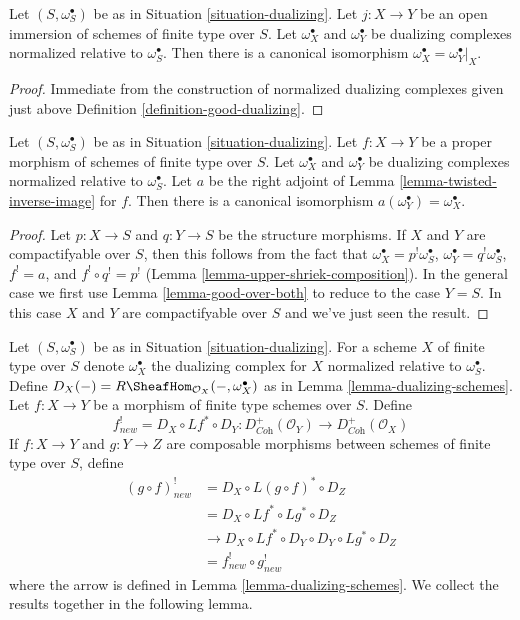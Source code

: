 \begin{lemma}
\label{lemma-open-immersion-good-dualizing-complex}
Let $(S, \omega_S^\bullet)$ be as in Situation \ref{situation-dualizing}.
Let $j : X \to Y$ be an open immersion of schemes of finite type over $S$.
Let $\omega_X^\bullet$ and $\omega_Y^\bullet$ be dualizing complexes
normalized relative to $\omega_S^\bullet$. Then there is a canonical
isomorphism $\omega_X^\bullet = \omega_Y^\bullet|_X$.
\end{lemma}

\begin{proof}
Immediate from the construction of normalized dualizing complexes
given just above
Definition \ref{definition-good-dualizing}.
\end{proof}

\begin{lemma}
\label{lemma-proper-map-good-dualizing-complex}
Let $(S, \omega_S^\bullet)$ be as in Situation \ref{situation-dualizing}.
Let $f : X \to Y$ be a proper morphism of schemes of finite type over $S$.
Let $\omega_X^\bullet$ and $\omega_Y^\bullet$ be dualizing complexes
normalized relative to $\omega_S^\bullet$. Let $a$ be the
right adjoint of Lemma \ref{lemma-twisted-inverse-image} for
$f$. Then there is a canonical isomorphism
$a(\omega_Y^\bullet) = \omega_X^\bullet$.
\end{lemma}

\begin{proof}
Let $p : X \to S$ and $q : Y \to S$ be the structure morphisms.
If $X$ and $Y$ are compactifyable over $S$, then this follows
from the fact that $\omega_X^\bullet = p^!\omega_S^\bullet$,
$\omega_Y^\bullet = q^!\omega_S^\bullet$, $f^! = a$, and
$f^! \circ q^! = p^!$ (Lemma \ref{lemma-upper-shriek-composition}).
In the general case we first use Lemma \ref{lemma-good-over-both}
to reduce to the case $Y = S$. In this case $X$ and $Y$
are compactifyable over $S$ and we've just seen the result.
\end{proof}

\noindent
Let $(S, \omega_S^\bullet)$ be as in Situation \ref{situation-dualizing}.
For a scheme $X$ of finite type over $S$ denote $\omega_X^\bullet$ the
dualizing complex for $X$ normalized relative to $\omega_S^\bullet$.
Define $D_X(-) = R\SheafHom_{\mathcal{O}_X}(-, \omega_X^\bullet)$
as in Lemma \ref{lemma-dualizing-schemes}.
Let $f : X \to Y$ be a morphism of finite type schemes over $S$.
Define
$$
f_{new}^! = D_X \circ Lf^* \circ D_Y :
D_{\textit{Coh}}^+(\mathcal{O}_Y)
\to
D_{\textit{Coh}}^+(\mathcal{O}_X)
$$
If $f : X \to Y$ and $g : Y \to Z$ are composable
morphisms between schemes of finite type over $S$, define
\begin{align*}
(g \circ f)^!_{new} & = D_X \circ L(g \circ f)^* \circ D_Z \\
& = D_X \circ Lf^* \circ Lg^* \circ D_Z \\
& \to D_X \circ Lf^* \circ D_Y \circ D_Y \circ Lg^* \circ D_Z \\
& = f^!_{new} \circ g^!_{new}
\end{align*}
where the arrow is defined in Lemma \ref{lemma-dualizing-schemes}.
We collect the results together in the following lemma.

